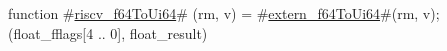 function #\hyperref[sailRISCVzriscvzyf64ToUi64]{riscv\_f64ToUi64}# (rm, v) = {
  #\hyperref[sailRISCVzexternzyf64ToUi64]{extern\_f64ToUi64}#(rm, v);
  (float_fflags[4 .. 0], float_result)
}
